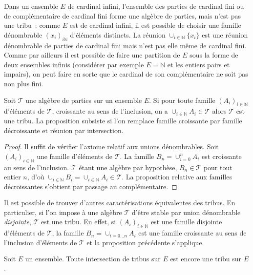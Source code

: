 \begin{exemple}
Dans un ensemble $E$ de cardinal infini, l'ensemble des parties
de cardinal fini ou de complémentaire de cardinal fini forme une
algèbre de parties, mais n'est pas une tribu~: comme $E$
est de cardinal infini, il est possible de choisir une famille
dénombrable 
$(x_i)_{i \mathbb{N}}$ d'éléments distincts. La réunion $\cup_{i
\in \mathbb{N}} \{ x_i \}$ est une réunion dénombrable de parties de
cardinal fini mais n'est pas elle même de cardinal fini. Comme par
ailleurs il est possible de faire une partition de $E$ sous la forme
de deux ensembles infinis (considérer par exemple $E=\mathbb{N}$ et
les entiers pairs et impairs), on peut faire en sorte que le cardinal
de son complémentaire ne soit pas non plus fini. 
\end{exemple}
\begin{prop}
Soit $\mathcal{T}$ une algèbre de parties sur un ensemble $E$. Si pour toute
famille $(A_i)_{i \in \mathbb{N}}$ d'éléments de $\mathcal{T}$, croissante au
sens de l'inclusion, on a $\cup_{i \in \mathbb{N}} A_i \in \mathcal{T}$
alors $\mathcal{T}$ est une tribu. La proposition subsiste
si l'on remplace famille croissante par famille décroissante et
réunion par intersection.
\end{prop}
\begin{proof}
Il suffit de vérifier l'axiome relatif aux unions dénombrables. Soit
$(A_i)_{i \in \mathbb{N}}$ une famille d'éléments de $\mathcal{T}$. La
famille $B_n = \cup_{i=0}^n A_i$ est croissante au sens de
l'inclusion. $\mathcal{T}$ étant une algèbre par hypothèse, $B_n \in
\mathcal{T}$ pour tout entier $n$, d'où $\cup_{i \in \mathbb{N}} B_i =
\cup_{i \in \mathbb{N}} A_i \in \mathcal{T}$.
La proposition relative aux familles décroissantes s'obtient par
passage au complémentaire.
\end{proof}
\begin{rem}
Il est possible de trouver d'autres caractérisations équivalentes des
tribus. En particulier, si l'on impose à une algèbre
$\mathcal{T}$ d'être stable par union dénombrable {\em disjointe},
$\mathcal{T}$ est une tribu. En effet, si $(A_i)_{i \in
\mathbb{N}}$ est une famille disjointe d'éléments de $\mathcal{T}$, la
famille $B_n =  \cup_{i=0 \dots n} A_i$ est une famille croissante au
sens de l'inclusion d'éléments de $\mathcal{T}$ et la proposition
précédente s'applique. 
\end{rem}
\begin{mandatory}
\begin{prop}Soit $E$ un ensemble. Toute intersection de
  tribus sur $E$ est encore une tribu sur $E$.
\end{prop}
\end{mandatory}
